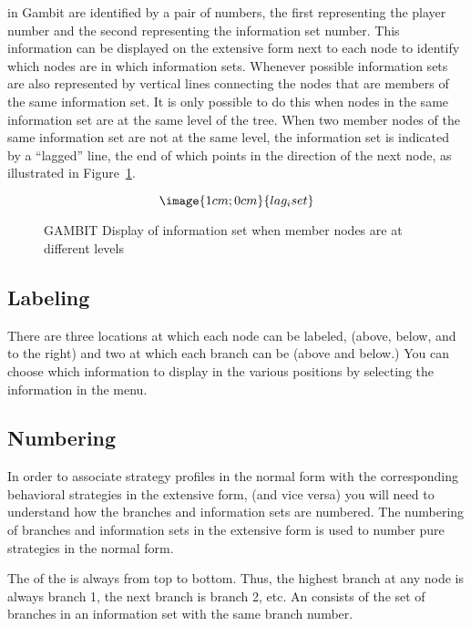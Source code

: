  in Gambit are identified by a 
pair of numbers, the first representing the player number and the 
second representing the information set number.  This information 
can be displayed on the extensive form next to each node to identify 
which nodes are in which information sets.  
Whenever possible information sets are also represented 
by vertical lines connecting the nodes that are members of the same information set.  
It is only possible to do this when nodes 
in the same information set are at the same level of the tree.  When two member
nodes of the same information set are not at the same level, the information 
set is indicated by a ``lagged'' line, the end of which points in 
the direction of the next node, as illustrated in Figure~\ref{fig_lag_iset}.   

\begin{figure}\label{fig_lag_iset}
$$\image{1cm;0cm}{lag_iset}$$
\caption{GAMBIT Display of information set when member nodes are at different levels}\label{fig_lag_iset}
\end{figure}

\subsection{Labeling}
There are three locations at which each node can be labeled, (above, 
below, and to the right) and two at which each branch can be 
 (above and below.) You can choose which information to display 
in the various positions by selecting the information in 
the   menu.  

\subsection{Numbering}\label{infosetnumbering}
In order  to associate strategy profiles in the 
normal form with the corresponding behavioral strategies in the extensive 
form, (and vice versa) you will need to understand how the branches and 
information sets are numbered.  The numbering of branches and information 
sets in the extensive form  is used to number pure strategies in the normal form.  

The  of the  is always
from top to bottom.  Thus, the highest branch at any node is always branch
1, the next branch is branch 2, etc. An  consists of 
the set of branches in an information set with the same branch number.  

